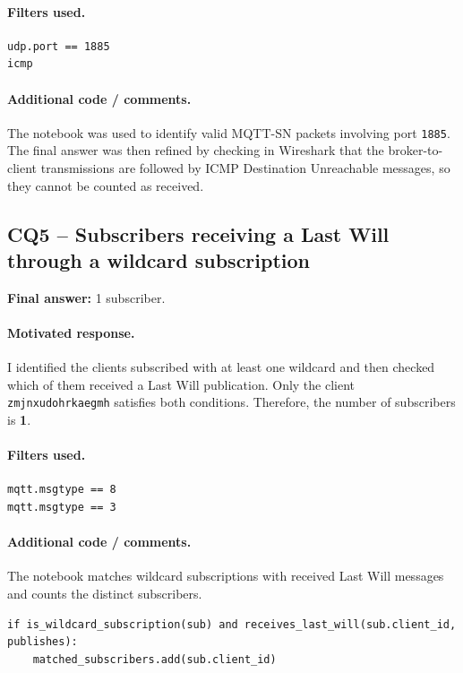 \documentclass[11pt,a4paper]{article}
\begin{document}
\paragraph{Filters used.}
\begin{verbatim}
udp.port == 1885
icmp
\end{verbatim}

\paragraph{Additional code / comments.}
The notebook was used to identify valid MQTT-SN packets involving port \texttt{1885}. The final
answer was then refined by checking in Wireshark that the broker-to-client transmissions are
followed by ICMP Destination Unreachable messages, so they cannot be counted as received.
\subsection*{CQ5 -- Subscribers receiving a Last Will through a wildcard subscription}

\textbf{Final answer:} 1 subscriber.

\paragraph{Motivated response.}
I identified the clients subscribed with at least one wildcard and then checked which of them
received a Last Will publication. Only the client \texttt{zmjnxudohrkaegmh} satisfies both
conditions. Therefore, the number of subscribers is \textbf{1}.

\paragraph{Filters used.}
\begin{verbatim}
mqtt.msgtype == 8
mqtt.msgtype == 3
\end{verbatim}

\paragraph{Additional code / comments.}
The notebook matches wildcard subscriptions with received Last Will messages and counts the
distinct subscribers.

\begin{verbatim}
if is_wildcard_subscription(sub) and receives_last_will(sub.client_id, publishes):
    matched_subscribers.add(sub.client_id)
\end{verbatim}
\end{document}
